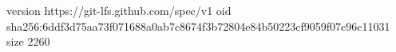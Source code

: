 version https://git-lfs.github.com/spec/v1
oid sha256:6ddf3d75aa73f071688a0ab7c8674f3b72804e84b50223cf9059f07c96c11031
size 2260
